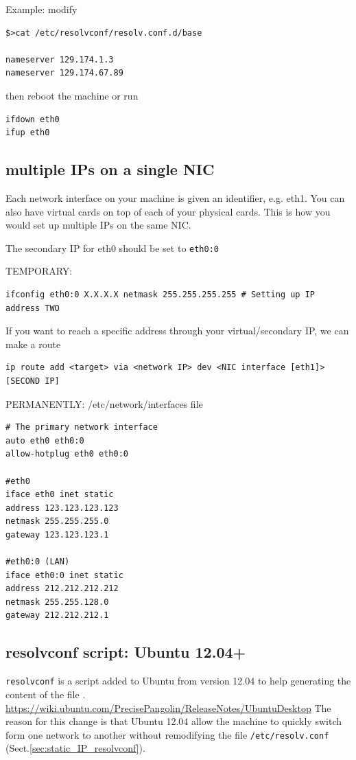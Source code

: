 Example: modify
\begin{verbatim}
$>cat /etc/resolvconf/resolv.conf.d/base

nameserver 129.174.1.3
nameserver 129.174.67.89
\end{verbatim}

then reboot the machine or run
\begin{verbatim}
ifdown eth0
ifup eth0
\end{verbatim}

\subsection{multiple IPs on a single NIC}

Each network interface on your machine is given an identifier, e.g. eth1.
You can also have virtual cards on top of each of your physical cards. This is
how you would set up multiple IPs on the same NIC.

The secondary IP for eth0 should be set to \verb!eth0:0! 

TEMPORARY:
\begin{verbatim}
ifconfig eth0:0 X.X.X.X netmask 255.255.255.255 # Setting up IP address TWO
\end{verbatim}

If you want to reach a specific address through your virtual/secondary IP, we
can make a route
\begin{verbatim}
ip route add <target> via <network IP> dev <NIC interface [eth1]> [SECOND IP]
\end{verbatim}

PERMANENTLY: /etc/network/interfaces file
\begin{verbatim}
# The primary network interface
auto eth0 eth0:0
allow-hotplug eth0 eth0:0

#eth0
iface eth0 inet static
address 123.123.123.123
netmask 255.255.255.0
gateway 123.123.123.1

#eth0:0 (LAN)
iface eth0:0 inet static
address 212.212.212.212
netmask 255.255.128.0
gateway 212.212.212.1
\end{verbatim}

\subsection{resolvconf script: Ubuntu 12.04+}
\label{sec:resolvconf_script}

\verb!resolvconf! is a script added to Ubuntu from version 12.04 to help
generating the content of the file .
\url{https://wiki.ubuntu.com/PrecisePangolin/ReleaseNotes/UbuntuDesktop}
The reason for this change is that Ubuntu 12.04 allow the machine to quickly
switch form one network to another without remodifying the file
\verb!/etc/resolv.conf! (Sect.\ref{sec:static_IP_resolvconf}). 


